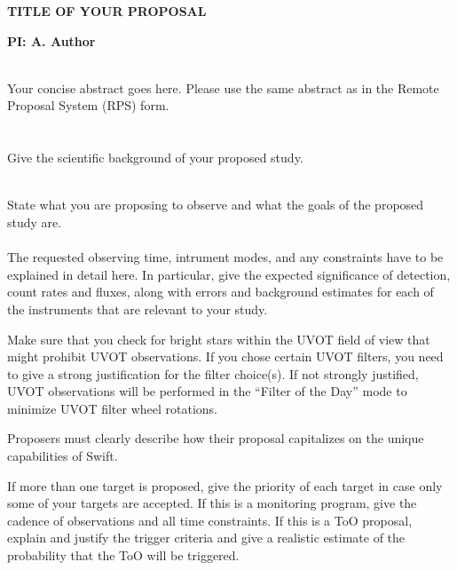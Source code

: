 \documentclass[letterpaper,11pt]{article}
\begin{document}
\pagestyle{plain}

\begin{center} 
\bfseries\uppercase{Title of Your Proposal}
\end{center}
\vspace{-0.3cm}
\centerline{\bf PI: {A. Author}}
 
\smallskip\\
Your concise abstract goes here. Please use the same abstract as in the Remote Proposal System (RPS) form. \\

\smallskip\\
\smallskip\\
Give the scientific background of your proposed study.

\smallskip\\
State what you are proposing to observe and what the goals of the proposed study are. \\

\smallskip\\
The requested observing time, intrument modes, and any constraints have to be explained in detail here. 
In particular, give the expected significance of detection, count rates and fluxes, along with errors 
and background estimates for each of the instruments that are relevant to your study. 

Make sure that you check for bright stars within the UVOT field of view that might prohibit UVOT observations.
If you chose certain UVOT filters, you need to give a strong justification for the filter choice(s). 
If not strongly justified, UVOT observations will be performed in the ``Filter of the Day'' mode to 
minimize UVOT filter wheel rotations. 

Proposers must clearly describe how their proposal capitalizes on the unique capabilities of Swift.

If more than one target is proposed, give the priority of each target in case only some of your targets are accepted.
If this is a monitoring program, give the cadence of observations and all time constraints. 
If this is a ToO proposal, explain and justify the trigger criteria and give a realistic estimate of the probability 
that the ToO will be triggered.
\end{document}
